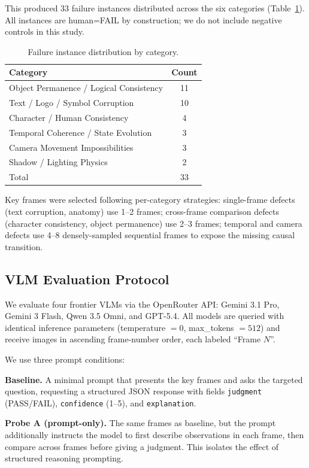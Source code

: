 \documentclass[11pt]{article}
\begin{document}
This produced 33 failure instances distributed across the six categories (Table~\ref{tab:distribution}). All instances are human=FAIL by construction; we do not include negative controls in this study.

\begin{table}[h]
\centering
\caption{Failure instance distribution by category.}
\label{tab:distribution}
\begin{tabular}{lc}
\toprule
Category & Count \\
\midrule
Object Permanence / Logical Consistency & 11 \\
Text / Logo / Symbol Corruption & 10 \\
Character / Human Consistency & 4 \\
Temporal Coherence / State Evolution & 3 \\
Camera Movement Impossibilities & 3 \\
Shadow / Lighting Physics & 2 \\
\midrule
Total & 33 \\
\bottomrule
\end{tabular}
\end{table}

Key frames were selected following per-category strategies: single-frame defects (text corruption, anatomy) use 1--2 frames; cross-frame comparison defects (character consistency, object permanence) use 2--3 frames; temporal and camera defects use 4--8 densely-sampled sequential frames to expose the missing causal transition.

\subsection{VLM Evaluation Protocol}

We evaluate four frontier VLMs via the OpenRouter API: Gemini 3.1 Pro, Gemini 3 Flash, Qwen 3.5 Omni, and GPT-5.4. All models are queried with identical inference parameters (temperature $= 0$, max\_tokens $= 512$) and receive images in ascending frame-number order, each labeled ``Frame $N$''.

We use three prompt conditions:

\textbf{Baseline.} A minimal prompt that presents the key frames and asks the targeted question, requesting a structured JSON response with fields \texttt{judgment} (PASS/FAIL), \texttt{confidence} (1--5), and \texttt{explanation}.

\textbf{Probe A (prompt-only).} The same frames as baseline, but the prompt additionally instructs the model to first describe observations in each frame, then compare across frames before giving a judgment. This isolates the effect of structured reasoning prompting.
\end{document}
